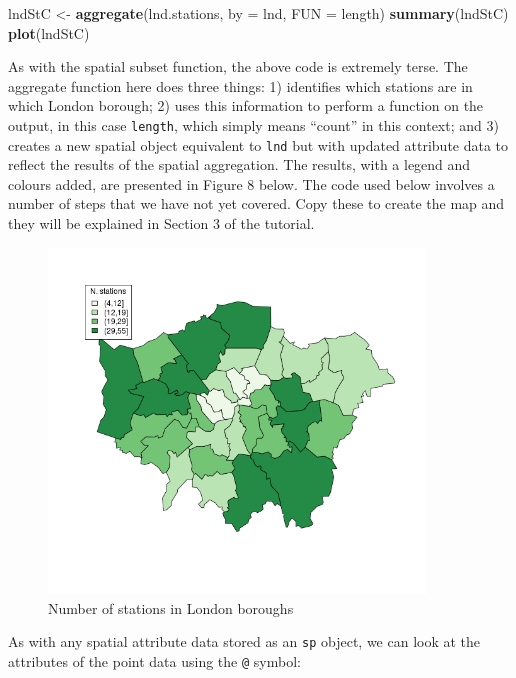 \documentclass[]{article}
\newenvironment{Shaded}{}{}
\newcommand{\KeywordTok}[1]{\textcolor[rgb]{0.00,0.44,0.13}{\textbf{{#1}}}}
\newcommand{\DataTypeTok}[1]{\textcolor[rgb]{0.56,0.13,0.00}{{#1}}}
\newcommand{\NormalTok}[1]{{#1}}
\let\Oldincludegraphics\includegraphics
\renewcommand{\includegraphics}[1]{\Oldincludegraphics[width=10cm]{#1}}
\begin{document}
\begin{Shaded}
\begin{Highlighting}[]
\NormalTok{lndStC <- }\KeywordTok{aggregate}\NormalTok{(lnd.stations, }\DataTypeTok{by =} \NormalTok{lnd, }\DataTypeTok{FUN =} \NormalTok{length)}
\KeywordTok{summary}\NormalTok{(lndStC)}
\KeywordTok{plot}\NormalTok{(lndStC)}
\end{Highlighting}
\end{Shaded}
As with the spatial subset function, the above code is extremely terse.
The aggregate function here does three things: 1) identifies which
stations are in which London borough; 2) uses this information to
perform a function on the output, in this case \texttt{length}, which
simply means ``count'' in this context; and 3) creates a new spatial
object equivalent to \texttt{lnd} but with updated attribute data to
reflect the results of the spatial aggregation. The results, with a
legend and colours added, are presented in Figure 8 below. The code used
below involves a number of steps that we have not yet covered. Copy
these to create the map and they will be explained in Section 3 of the
tutorial.

\begin{figure}[htbp]
\centering
\includegraphics{figure/nStations.png}
\caption{Number of stations in London boroughs}
\end{figure}

As with any spatial attribute data stored as an \texttt{sp} object, we
can look at the attributes of the point data using the \texttt{@}
symbol:
\end{document}
